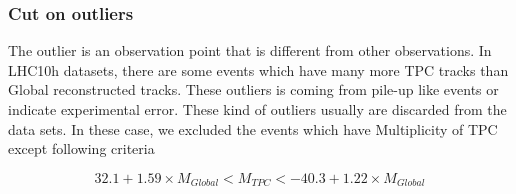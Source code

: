 \subsubsection{Cut on outliers}
	The outlier is an observation point that is different from other observations. In LHC10h datasets, there are some events which have many more TPC tracks than Global reconstructed tracks. These outliers is coming from pile-up like events or indicate experimental error. These kind of outliers usually are discarded from the data sets. In these case, we excluded the events which have Multiplicity of TPC except following criteria	
	
	\begin{equation}
		32.1 + 1.59 \times M_{Global} < M_{TPC} < -40.3 + 1.22 \times M_{Global} 
	\end{equation}
	
